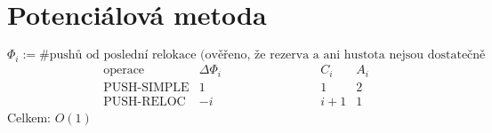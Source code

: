 \documentclass[a4paper]{article}
\begin{document}
\renewcommand{\headrulewidth}{0pt} %
\thispagestyle{fancy} %
{}

\section*{Potenciálová metoda}
$ \Phi_i := \text{\# pushů od poslední relokace (ověřeno, že rezerva a ani hustota nejsou dostatečně silné)} $
\begin{align*}
	& \text{operace} & \Delta \Phi_i  \hspace{3cm}  & C_i & A_i \\
	& \text{PUSH-SIMPLE} & 1  \hspace{3cm}  & 1 & 2 \\
	& \text{PUSH-RELOC} & -i  \hspace{3cm}  & i+1 & 1 
\end{align*}
Celkem: $O(1)$
\end{document}
